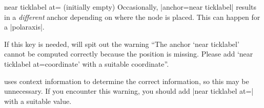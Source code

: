 \begin{pgfplotskey}{near ticklabel at= (initially empty)}
    Occasionally, |anchor=near ticklabel| results in a \emph{different} anchor
    depending on where the node is placed. This can happen for a |polaraxis|.

    If this key is needed, \PGFPlots{} will spit out the warning ``The anchor
    `near ticklabel' cannot be computed correctly because the position is
    missing. Please add `near ticklabel at=coordinate' with a suitable
    coordinate''.

    \PGFPlots{} uses context information to determine the correct information,
    so this may be unnecessary. If you encounter this warning, you should add
    |near ticklabel at=| with a suitable value.
\end{pgfplotskey}


